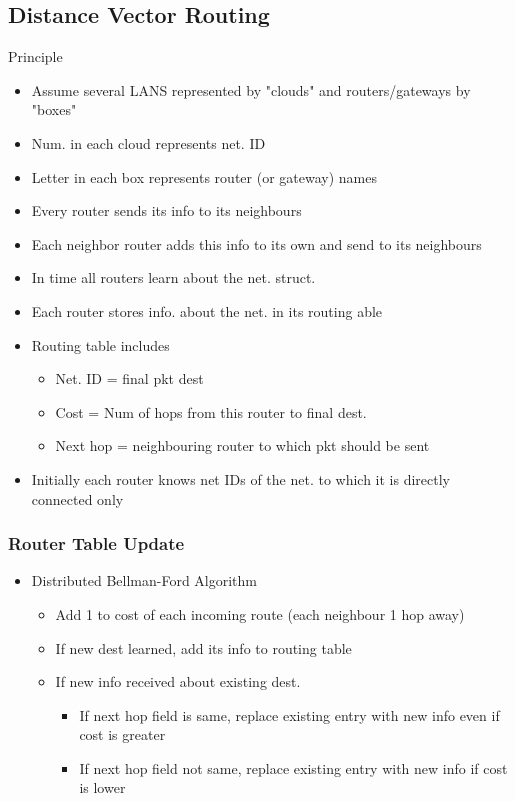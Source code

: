 \subsection{Distance Vector Routing}
Principle
\begin{itemize}
	\item Assume several LANS represented by "clouds" and routers/gateways
		by "boxes"
	\item Num. in each cloud represents net. ID
	\item Letter in each box represents router (or gateway) names
	\item Every router sends its info to its neighbours
	\item Each neighbor router adds this info to its own and send to its
		neighbours
	\item In time all routers learn about the net. struct.
	\item Each router stores info. about the net. in its routing able
	\item Routing table includes
	\begin{itemize}
		\item Net. ID = final pkt dest
		\item Cost = Num of hops from this router to final dest.
		\item Next hop = neighbouring router to which pkt should be sent
	\end{itemize}
	\item Initially each router knows net IDs of the net. to which it is
		directly connected only
\end{itemize}
\subsubsection{Router Table Update}
\begin{itemize}
	\item Distributed Bellman-Ford Algorithm
	\begin{itemize}
		\item Add 1 to cost of each incoming route (each neighbour 1 hop
			away)
		\item If new dest learned, add its info to routing table
		\item If new info received about existing dest.
		\begin{itemize}
			\item If next hop field is same, replace existing entry
				with new info even if cost is greater
			\item If next hop field not same, replace existing entry
				with new info if cost is lower
		\end{itemize}
	\end{itemize}
\end{itemize}
